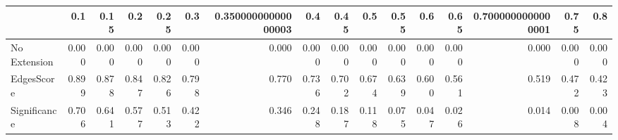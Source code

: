 \begin{tabular}{lrrrrrrrrrrrrrrr}
\toprule
{} &   0.1 &  0.15 &   0.2 &  0.25 &   0.3 & 0.35000000000000003 &   0.4 &  0.45 &   0.5 &  0.55 &   0.6 &  0.65 & 0.7000000000000001 &  0.75 &   0.8 \\
\midrule
No Extension & 0.000 & 0.000 & 0.000 & 0.000 & 0.000 &               0.000 & 0.000 & 0.000 & 0.000 & 0.000 & 0.000 & 0.000 &              0.000 & 0.000 & 0.000 \\
EdgesScore   & 0.899 & 0.878 & 0.847 & 0.826 & 0.798 &               0.770 & 0.736 & 0.702 & 0.674 & 0.639 & 0.600 & 0.561 &              0.519 & 0.472 & 0.423 \\
Significance & 0.706 & 0.641 & 0.577 & 0.513 & 0.422 &               0.346 & 0.248 & 0.187 & 0.118 & 0.075 & 0.047 & 0.026 &              0.014 & 0.008 & 0.004 \\
\bottomrule
\end{tabular}
